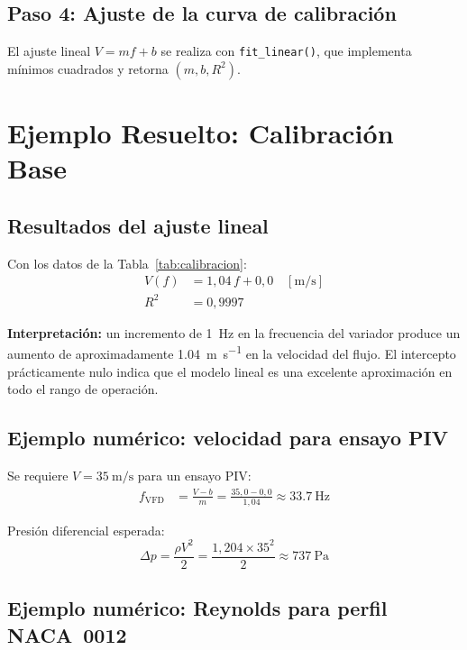 \documentclass[12pt,a4paper]{article}
\begin{document}
\subsection{Paso 4: Ajuste de la curva de calibración}

El ajuste lineal $V = m f + b$ se realiza con \texttt{fit\_linear()}, que
implementa mínimos cuadrados y retorna $(m, b, R^2)$.

\section{Ejemplo Resuelto: Calibración Base}
\label{sec:ejemplo}

\subsection{Resultados del ajuste lineal}

Con los datos de la Tabla~\ref{tab:calibracion}:
\begin{align}
	V(f) & = 1{,}04\,f + 0{,}0 \quad [\si{\metre\per\second}] \\
	R^2  & = 0{,}9997
	\label{eq:V_lineal}
\end{align}

\textbf{Interpretación:} un incremento de \SI{1}{\Hz} en la frecuencia del
variador produce un aumento de aproximadamente \SI{1.04}{\metre\per\second} en
la velocidad del flujo.  El intercepto prácticamente nulo indica que el modelo
lineal es una excelente aproximación en todo el rango de operación.

\subsection{Ejemplo numérico: velocidad para ensayo PIV}

Se requiere $V = \SI{35}{\metre\per\second}$ para un ensayo PIV:
\begin{align}
	f_\mathrm{VFD} & = \frac{V - b}{m} = \frac{35{,}0 - 0{,}0}{1{,}04}
	\approx \SI{33.7}{\Hz}
	\label{eq:f_piv}
\end{align}

Presión diferencial esperada:
\begin{equation}
	\Delta p = \frac{\rho V^2}{2} = \frac{1{,}204 \times 35^2}{2}
	\approx \SI{737}{\pascal}
	\label{eq:dp_piv}
\end{equation}

\subsection{Ejemplo numérico: Reynolds para perfil NACA~0012}
\end{document}
